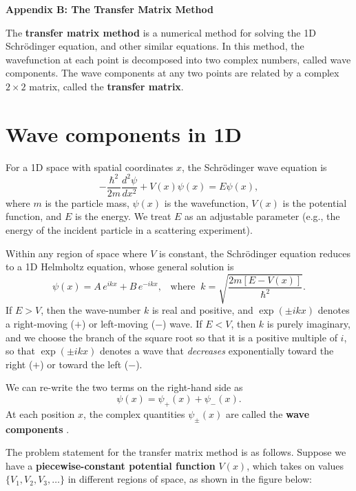 \documentclass[pra,12pt]{revtex4}
\begin{document}
\begin{center}
{\large \textbf{Appendix B: The Transfer Matrix Method}}
\end{center}

\noindent
The \textbf{transfer matrix method} is a numerical method for solving
the 1D Schr\"odinger equation, and other similar equations.  In this
method, the wavefunction at each point is decomposed into two complex
numbers, called wave components.  The wave components at any two
points are related by a complex $2\times2$ matrix, called the
\textbf{transfer matrix}.

\section{Wave components in 1D}

For a 1D space with spatial coordinates $x$, the Schr\"odinger wave
equation is
\begin{equation}
  -\frac{\hbar^2}{2m}\frac{d^2\psi}{dx^2} + V(x) \psi(x) = E\psi(x),
\end{equation}
where $m$ is the particle mass, $\psi(x)$ is the wavefunction, $V(x)$
is the potential function, and $E$ is the energy.  We treat $E$ as an
adjustable parameter (e.g., the energy of the incident particle in a
scattering experiment).

Within any region of space where $V$ is constant, the Schr\"odinger
equation reduces to a 1D Helmholtz equation, whose general solution is
\begin{equation}
  \psi(x) = A\, e^{ik x} + B\, e^{-ik x}, \;\;\; \mathrm{where}\;\; k = \sqrt{\frac{2m[E-V(x)]}{\hbar^2}}.
\end{equation}
If $E > V$, then the wave-number $k$ is real and positive, and
$\exp(\pm ikx)$ denotes a right-moving ($+$) or left-moving ($-$)
wave.  If $E < V$, then $k$ is purely imaginary, and we choose the
branch of the square root so that it is a positive multiple of $i$, so
that $\exp(\pm ikx)$ denotes a wave that \textit{decreases}
exponentially toward the right ($+$) or toward the left ($-$).

We can re-write the two terms on the right-hand side as
\begin{equation}
  \psi(x) = \psi_+(x) + \psi_-(x).
\end{equation}
At each position $x$, the complex quantities $\psi_\pm(x)$ are called
the \textbf{wave components} .

The problem statement for the transfer matrix method is as follows.
Suppose we have a \textbf{piecewise-constant potential function}
$V(x)$, which takes on values $\{V_1, V_2, V_3, \dots\}$ in different
regions of space, as shown in the figure below:
\end{document}
